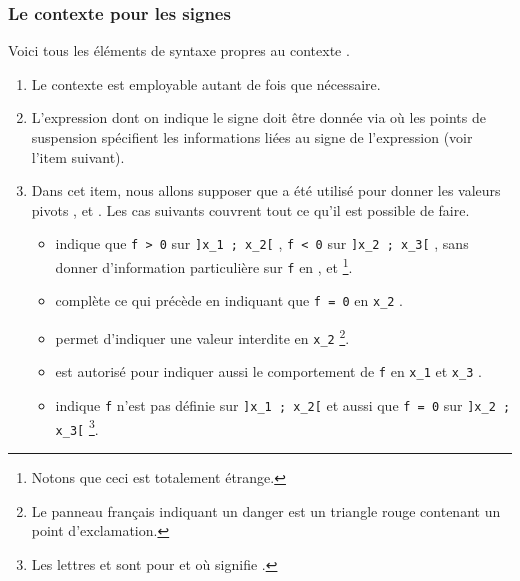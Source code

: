 \documentclass[10pt, a4paper]{article}
\begin{document}

\subsubsection{Le contexte  pour les signes}

Voici tous les éléments de syntaxe propres au contexte .
\begin{enumerate}
    \item Le contexte  est employable autant de fois que nécessaire.


	\item L'expression dont on indique le signe doit être donnée via  où les points de suspension spécifient les informations liées au signe de l'expression (voir l'item suivant). 


    \item Dans cet item, nous allons supposer que  a été utilisé pour donner les valeurs pivots  ,  et  . Les cas suivants couvrent tout ce qu'il est possible de faire.
    \begin{itemize}
        \item {} indique que
        \verb#f > 0# sur \verb#]x_1 ; x_2[# ,
        \verb#f < 0# sur \verb#]x_2 ; x_3[# ,
        sans donner d'information particulière sur
        \verb#f# en  ,  et  
        \footnote{
        	Notons que ceci est totalement étrange.
		}.


        \item {} complète ce qui précède en indiquant que \verb#f = 0# en \verb#x_2# .


        \item {} permet d'indiquer une valeur interdite en \verb#x_2#
        \footnote{
        	Le panneau français indiquant un danger est un triangle rouge contenant un point d'exclamation.
		}.


        \item {} est autorisé pour indiquer aussi le comportement de \verb#f# en \verb#x_1# et \verb#x_3# .


        \item {}  indique \verb#f# n'est pas définie sur \verb#]x_1 ; x_2[# et aussi que \verb#f = 0# sur \verb#]x_2 ; x_3[#
        \footnote{
        	Les lettres  et  sont pour 
			 et 
			où
			 signifie .
		}.
    \end{itemize}
\end{enumerate}
\end{document}
